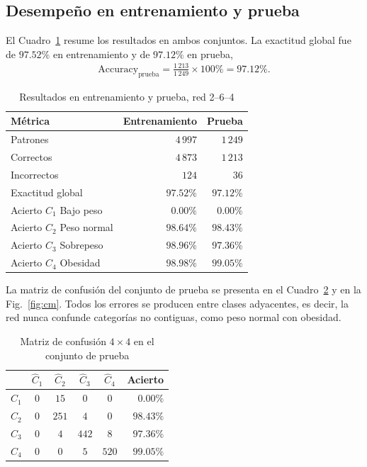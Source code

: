 \documentclass[conference]{IEEEtran}
\begin{document}
\subsection{Desempeño en entrenamiento y prueba}
El Cuadro~\ref{tab:desempeno} resume los resultados en ambos conjuntos. La
exactitud global fue de $97.52\%$ en entrenamiento y de $97.12\%$ en prueba,
\begin{align*}
    \text{Accuracy}_{\text{prueba}}=\frac{1\,213}{1\,249}\times100\%=97.12\%.
\end{align*}

\begin{table}[htbp]
\caption{Resultados en entrenamiento y prueba, red 2--6--4}
\label{tab:desempeno}
\begin{center}
\begin{tabular}{lrr}
\toprule
\textbf{Métrica} & \textbf{Entrenamiento} & \textbf{Prueba} \\
\midrule
Patrones               & $4\,997$  & $1\,249$ \\
Correctos              & $4\,873$  & $1\,213$ \\
Incorrectos            & $124$     & $36$ \\
Exactitud global       & $97.52\%$ & $97.12\%$ \\
\midrule
Acierto $C_1$ Bajo peso   & $0.00\%$  & $0.00\%$ \\
Acierto $C_2$ Peso normal & $98.64\%$ & $98.43\%$ \\
Acierto $C_3$ Sobrepeso   & $98.96\%$ & $97.36\%$ \\
Acierto $C_4$ Obesidad    & $98.98\%$ & $99.05\%$ \\
\bottomrule
\end{tabular}
\end{center}
\end{table}

La matriz de confusión del conjunto de prueba se presenta en el
Cuadro~\ref{tab:cm} y en la Fig.~\ref{fig:cm}. Todos los errores se
producen entre clases adyacentes, es decir, la red nunca confunde
categorías no contiguas, como peso normal con obesidad.

\begin{table}[htbp]
\caption{Matriz de confusión $4\times4$ en el conjunto de prueba}
\label{tab:cm}
\begin{center}
\begin{tabular}{c|cccc|r}
\toprule
 & $\hat{C}_1$ & $\hat{C}_2$ & $\hat{C}_3$ & $\hat{C}_4$ & \textbf{Acierto} \\
\midrule
$C_1$ & $0$ & $15$  & $0$   & $0$   & $0.00\%$ \\
$C_2$ & $0$ & $251$ & $4$   & $0$   & $98.43\%$ \\
$C_3$ & $0$ & $4$   & $442$ & $8$   & $97.36\%$ \\
$C_4$ & $0$ & $0$   & $5$   & $520$ & $99.05\%$ \\
\bottomrule
\end{tabular}
\end{center}
\end{table}
\end{document}
